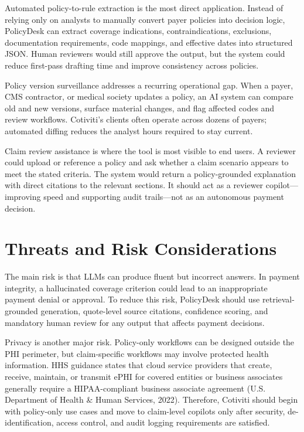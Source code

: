 \documentclass[11pt]{article}
\begin{document}
Automated policy-to-rule extraction is the most direct application. Instead of relying only on analysts to manually convert payer policies into decision logic, PolicyDesk can extract coverage indications, contraindications, exclusions, documentation requirements, code mappings, and effective dates into structured JSON. Human reviewers would still approve the output, but the system could reduce first-pass drafting time and improve consistency across policies.

Policy version surveillance addresses a recurring operational gap. When a payer, CMS contractor, or medical society updates a policy, an AI system can compare old and new versions, surface material changes, and flag affected codes and review workflows. Cotiviti's clients often operate across dozens of payers; automated diffing reduces the analyst hours required to stay current.

Claim review assistance is where the tool is most visible to end users. A reviewer could upload or reference a policy and ask whether a claim scenario appears to meet the stated criteria. The system would return a policy-grounded explanation with direct citations to the relevant sections. It should act as a reviewer copilot---improving speed and supporting audit trails---not as an autonomous payment decision.

\section*{Threats and Risk Considerations}
The main risk is that LLMs can produce fluent but incorrect answers. In payment integrity, a hallucinated coverage criterion could lead to an inappropriate payment denial or approval. To reduce this risk, PolicyDesk should use retrieval-grounded generation, quote-level source citations, confidence scoring, and mandatory human review for any output that affects payment decisions.

Privacy is another major risk. Policy-only workflows can be designed outside the PHI perimeter, but claim-specific workflows may involve protected health information. HHS guidance states that cloud service providers that create, receive, maintain, or transmit ePHI for covered entities or business associates generally require a HIPAA-compliant business associate agreement (U.S. Department of Health \& Human Services, 2022). Therefore, Cotiviti should begin with policy-only use cases and move to claim-level copilots only after security, de-identification, access control, and audit logging requirements are satisfied.
\end{document}
